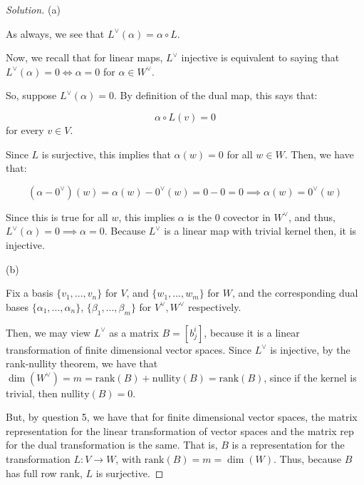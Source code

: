 \documentclass[10pt]{article}
\begin{document}
\begin{proof}[Solution]

(a)

As always, we see that $L^\vee(\alpha) = \alpha \circ L$.

Now, we recall that for linear maps, $L^\vee$ injective is equivalent to saying that $L^\vee(\alpha) = 0 \iff \alpha = 0$ for $\alpha \in W^\vee$. 

So, suppose $L^\vee(\alpha) = 0$. By definition of the dual map, this says that:

$$ \alpha \circ L(v) = 0$$ for every $v \in V$. 

Since $L$ is surjective, this implies that $\alpha(w) = 0$ for all $w \in W$. Then, we have that:

$$ (\alpha - 0^\vee)(w) = \alpha(w) - 0^\vee(w) = 0 - 0 = 0 \implies \alpha(w) = 0^\vee(w)$$

Since this is true for all $w$, this implies $\alpha$ is the $0$ covector in $W^\vee$, and thus, $L^\vee(\alpha) = 0 \implies \alpha = 0$. Because $L^\vee$ is a linear map with trivial kernel then, it is injective.

(b)

Fix a basis $\{ v_1,...,v_n \}$ for $V$, and $\{ w_1,...,w_m \}$ for $W$, and the corresponding dual bases $\{ \alpha_1,...,\alpha_n \}$, $\{ \beta_1,...,\beta_m\}$ for $V^\vee, W^\vee$ respectively.

Then, we may view $L^\vee$ as a matrix $B = [ b^i_j ]$, because it is a linear transformation of finite dimensional vector spaces. Since $L^\vee $ is injective, by the rank-nullity theorem, we have that $\dim(W^\vee) = m = \text{rank}(B) + \text{nullity}(B) =\text{rank}(B)$, since if the kernel is trivial, then $\text{nullity}(B) = 0$. 

But, by question 5, we have that for finite dimensional vector spaces, the matrix representation for the linear transformation of vector spaces and the matrix rep for the dual transformation is the same. That is, $B$ is a representation for the transformation $L: V \to W$, with $\text{rank}(B) = m = \dim(W)$. Thus, because $B$ has full row rank, $L$ is surjective.

\end{proof}
\end{document}
